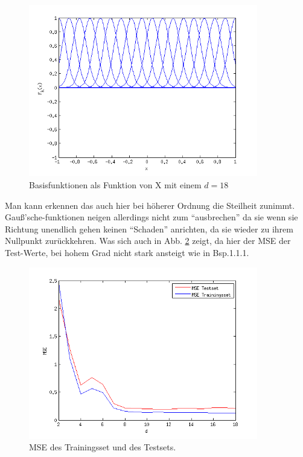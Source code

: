 \begin{figure}[hp!]
\begin{center}
 \includegraphics[width=10cm]{./figures/RBF_18}
 \caption[Basisfunktionen als Funktion von X, d=18]{Basisfunktionen als Funktion von X mit einem $d=18$}
\label{fig:RBF_18}
\end{center}
\end{figure}
Man kann erkennen das auch hier bei höherer Ordnung die Steilheit zunimmt. Gau\ss{}'sche-funktionen neigen allerdings nicht zum ``ausbrechen''
da sie wenn sie Richtung unendlich gehen keinen ``Schaden'' anrichten, da sie wieder zu ihrem Nullpunkt zurückkehren.
Was sich auch in Abb. \ref{fig:RBF_MSE} zeigt, da hier der MSE der Test-Werte, bei hohem Grad nicht stark ansteigt wie in Bsp.1.1.1.
 

\begin{figure}[hp!]
\begin{center}
 \includegraphics[width=10cm]{./figures/RBF_MSE}
 \caption[MSE]{MSE des Trainingsset und des Testsets.}
\label{fig:RBF_MSE}
\end{center}
\end{figure}
\clearpage